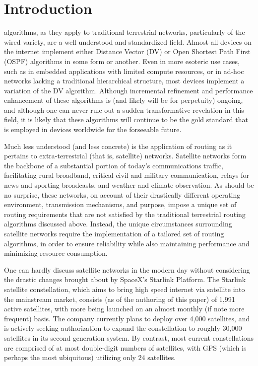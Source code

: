\section{Introduction}\label{sec:introduction}
 algorithms, as they apply to traditional terrestrial networks, particularly of the wired variety, are a well understood and standardized field. Almost all devices on the internet implement either Distance Vector (DV) or Open Shortest Path First (OSPF) algorithms in some form or another. Even in more esoteric use cases, such as in embedded applications with limited compute resources, or in ad-hoc networks lacking a traditional hierarchical structure, most devices implement a variation of the DV algorithm. Although incremental refinement and performance enhancement of these algorithms is (and likely will be for perpetuity) ongoing, and although one can never rule out a sudden transformative revelation in this field, it is likely that these algorithms will continue to be the gold standard that is employed in devices worldwide for the forseeable future.

Much less understood (and less concrete) is the application of routing as it pertains to extra-terrestrial (that is, satellite) networks. Satellite networks form the backbone of a substantial portion of today's communications traffic, facilitating rural broadband, critical civil and military communication, relays for news and sporting broadcasts, and weather and climate observation. As should be no surprise, these networks, on account of their drastically different operating environment, transmission mechanisms, and purpose, impose a unique set of routing requirements that are not satisfied by the traditional terrestrial routing algorithms discussed above. Instead, the unique circumstances surrounding satellite networks require the implementation of a tailored set of routing algorithms, in order to ensure reliability while also maintaining performance and minimizing resource consumption.

One can hardly discuss satellite networks in the modern day without considering the drastic changes brought about by SpaceX's Starlink Platform. The Starlink satellite constellation, which aims to bring high speed internet via satellite into the mainstream market, consists (as of the authoring of this paper) of 1,991 active satellites, with more being launched on an almost monthly (if note more frequent) basis. The company currently plans to deploy over 4,000 satellites, and is actively seeking authorization to expand the constellation to roughly 30,000 satellites in its second generation system. By contrast, most current constellations are comprised of at most double-digit numbers of satellites, with GPS (which is perhaps the most ubiquitous) utilizing only 24 satellites.

